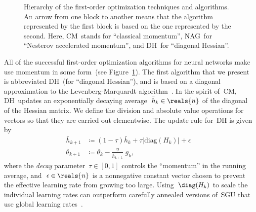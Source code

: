 \documentclass[11pt,a4paper]{article}
\numberwithin{equation}{section}
\begin{document}
\begin{figure}[t]
\centering
{}
\caption{Hierarchy of the first-order optimization techniques and algorithms.
An arrow from one block to another means that the algorithm represented by the
first block is based on the one represented by the second. Here, CM~stands for
``classical momentum'', NAG~for ``Nesterov accelerated momentum'', and DH~for
``diagonal Hessian''.\label{fig:first_order_hierarchy}}
\end{figure}

All of the successful first-order optimization algorithms for neural networks
make use momentum in some form~(see Figure~\ref{fig:first_order_hierarchy}). The
first algorithm that we present is abbreviated DH~(for ``diagonal Hessian''),
and is based on a diagonal approximation to the Levenberg-Marquardt
algorithm~\citep{lecun-98b}.  In the spirit of~CM, DH~updates an exponentially
decaying average~$\bar{h}_k \in \reals{n}$ of the diagonal of the Hessian
matrix. We define the division and absolute value operations for vectors so that
they are carried out elementwise. The update rule for~DH is given by
\begin{align*}
	\bar{h}_{k + 1} &\coloneqq (1 - \tau) \bar{h}_k + \tau |\text{diag}(H_k)| + \epsilon \\
	\theta_{k + 1}  &\coloneqq \theta_k - \frac{\eta}{\bar{h}_{k + 1}} \;g_k,
\end{align*}
where the \emph{decay} parameter~$\tau \in [0, 1]$ controls the ``momentum'' in
the running average, and~$\epsilon \in \reals{n}$ is a nonnegative constant
vector chosen to prevent the effective learning rate from growing too large.
Using~$\diag(H_k)$ to scale the individual learning rates can outperform
carefully annealed versions of~SGU that use global learning
rates~\citep{lecun-98b}.
\end{document}
